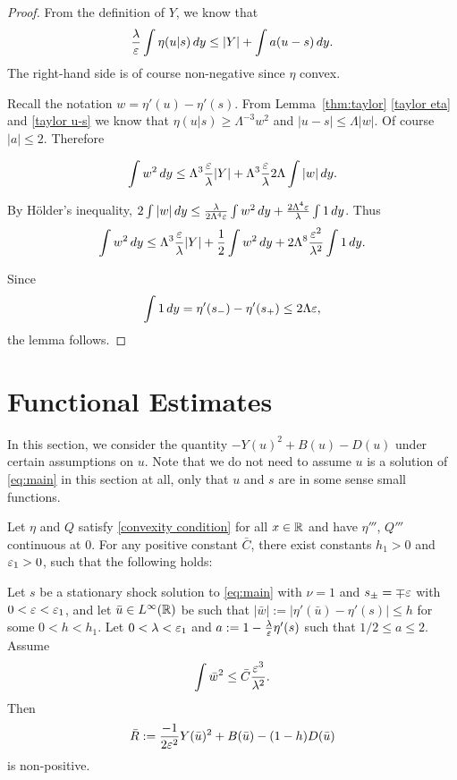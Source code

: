 \begin{proof}
From the definition of $Y$, we know that
\[ \frac{\lambda}{\varepsilon} \int \eta(u|s) \,dy \leq |Y| + \int a (u-s) \,dy. \]
The right-hand side is of course non-negative since $\eta$ convex.  

Recall the notation $w = \eta'(u) - \eta'(s)$.  From Lemma~\ref{thm:taylor} \ref{taylor eta} and \ref{taylor u-s} we know that $\eta(u|s) \geq \Lambda^{-3}  w^2$ and $|u-s| \leq \Lambda |w|$.  Of course $|a| \leq 2$.  Therefore

\[ \int w^2 \,dy \leq \Lambda^3 \frac{\varepsilon}{\lambda} |Y| + \Lambda^3 \frac{\varepsilon}{\lambda} 2 \Lambda \int |w| \,dy. \]

By H\"{o}lder's inequality, $2 \int |w| \,dy \leq \frac{\lambda}{2 \Lambda^4 \varepsilon} \int w^2 \,dy + \frac{2 \Lambda^4 \varepsilon}{\lambda} \int 1 \,dy$.  Thus
\[ \int w^2 \,dy \leq \Lambda^3 \frac{\varepsilon}{\lambda} |Y| + \frac{1}{2} \int w^2 \,dy + 2 \Lambda^8 \frac{\varepsilon^2}{\lambda^2} \int 1 \,dy. \]

Since 
\[ \int 1 \,dy = \eta'(s_-)-\eta'(s_+) \leq 2 \Lambda \varepsilon, \]
the lemma follows.  
\end{proof}

\section{Functional Estimates} \label{sec:functional}
In this section, we consider the quantity $-Y(u)^2 + B(u) - D(u)$ under certain assumptions on $u$.  Note that we do not need to assume $u$ is a solution of \eqref{eq:main} in this section at all, only that $u$ and $s$ are in some sense small functions.  

\begin{proposition} \label{thm:functional near}
Let $\eta$ and $Q$ satisfy \eqref{convexity condition} for all $x \in \mathbb{R}$ and have $\eta'''$, $Q'''$ continuous at 0.  For any positive constant $\bar{C}$, there exist constants $h_1 > 0$ and $\varepsilon_1 > 0$, such that the following holds:

Let $s$ be a stationary shock solution to \eqref{eq:main} with $\nu = 1$ and $s_{\pm}= \mp \varepsilon$ with $0 < \varepsilon < \varepsilon_1$, and let $\bar{u} \in L^\infty(\mathbb{R})$ be such that $|\bar{w}| := |\eta'(\bar{u}) - \eta'(s)| \leq h$ for some $0 < h < h_1$.  Let $0 < \lambda < \varepsilon_1$ and $a := 1-\frac{\lambda}{\varepsilon} \eta'(s)$ such that $1/2 \leq a \leq 2$. Assume
\[ \int \bar{w}^2 \leq \bar{C} \frac{\varepsilon^3}{\lambda^2}. \]
Then
\[ \bar{R} := \frac{-1}{2\varepsilon^2} Y(\bar{u})^2 + B(\bar{u}) - (1-h) D(\bar{u}) \]
is non-positive.  
\end{proposition}


